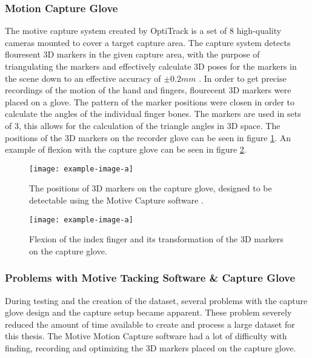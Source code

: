 \documentclass[../main.tex]{subfiles}
\begin{document}
\subsubsection{Motion Capture Glove}

The motive capture system created by OptiTrack is a set of 8 high-quality cameras mounted to cover a target capture area.
The capture system detects flouresent 3D markers in the given capture area, with the purpose of triangulating the markers and effectively calculate 3D poses for the markers in the scene down to an effective accuracy of $\pm 0.2mm$ \cite{motive}.
In order to get precise recordings of the motion of the hand and fingers, flourecent 3D markers were placed on a glove.
The pattern of the marker positions were closen in order to calculate the angles of the individual finger bones.
The markers are used in sets of 3, this allows for the calculation of the triangle angles in 3D space.
The positions of the 3D markers on the recorder glove can be seen in figure \ref{fig:glove}.
An example of flexion with the capture glove can be seen in figure \ref{fig:glove_flex}.


\begin{center}
\begin{figure}[H]
\texttt{[image: example-image-a]}
\caption{The positions of 3D markers on the capture glove, designed to be detectable using the  Motive Capture software \cite{motive}.}
\label{fig:glove}
\end{figure}
\end{center}

\begin{center}
\begin{figure}[h]
\texttt{[image: example-image-a]}
\caption{Flexion of the index finger and its transformation of the 3D markers on the capture glove.}
\label{fig:glove_flex}
\end{figure}
\end{center}

\subsubsection{Problems with Motive Tacking Software \& Capture Glove}
\label{sec:motiveproblems}

During testing and the creation of the dataset, several problems with the capture glove design and the capture setup became apparent.
These problem severely reduced the amount of time available to create and process a large dataset for this thesis.
The Motive Motion Capture software \cite{motive} had a lot of difficulty with finding, recording and optimizing the 3D markers placed on the capture glove.
\end{document}
